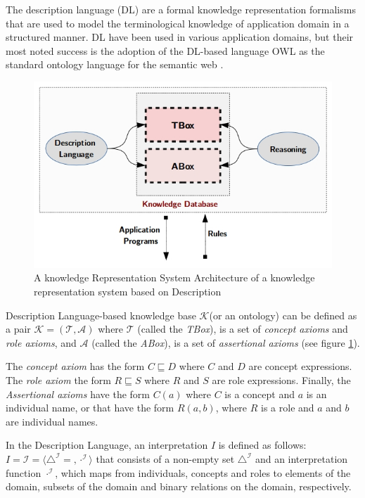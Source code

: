		The description language (DL) \citep{Baader2003} are a formal knowledge representation formalisms
		that are used to model the terminological knowledge of application domain in a structured manner.
		DL have been used in various application domains, but their most noted success is the adoption 
		of the DL-based language OWL \citep{Horrocks2003} as the standard ontology language for the 
		semantic web \citep{Berners-Lee2001}.

		\begin{figure}[ht]
			\centering
			\includegraphics[scale=0.7]{figures/state_fig6}
			\caption{A knowledge Representation System Architecture of a knowledge
				representation system based on Description \citep{Baader2003}}
			\label{state_fig6}
		\end{figure}

		Description Language-based knowledge base $\mathcal{K}$(or an ontology) can be defined as 
		a pair $\mathcal{K} = (\mathcal{T}, \mathcal{A})$  where $\mathcal{T}$ (called the \emph{TBox}), 
		is a set of \textit{concept axioms} and \textit{role axioms}, and $\mathcal{A}$ (called the 
		\emph{ABox}), is a set of \textit{assertional axioms} (see figure \ref{state_fig6}).

		The \emph{concept axiom} has the form $C \sqsubseteq D$ where $C$ and $D$ are concept expressions.
		The \emph{role axiom}  the form $R \sqsubseteq S$ where $R$  and $S$ are role expressions. 
		Finally, the \emph{Assertional axioms} have the form $C(a)$ where $C$ is a concept and $a$ 
		is an individual name, or that have the form $R(a,b)$, where $R$ is a role and $a$ and $b$ 
		are individual names.

		In the Description Language, an interpretation $I$ is defined as follows: $I=\mathcal{I} 
		= \langle{}\triangle^{\mathcal{I}}= , \cdot^{\mathcal{I}}\rangle{}$ that consists of
		a non-empty set $\triangle^{\mathcal{I}}$ and an interpretation function $\cdot^{\mathcal{I}}$, 
		which maps from individuals, concepts and roles to elements of the domain, subsets of the domain 
		and binary relations on the domain, respectively.

